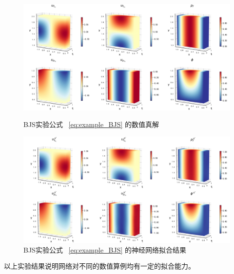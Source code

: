 \begin{figure}[H]
    \centering
    \includegraphics[width=0.75\linewidth]{images/example_BJS_exact.png}
    \caption{BJS实验公式 ~\eqref{eq:example_BJS} 的数值真解}
    \label{fig:example_BJS_exact}
    \includegraphics[width=0.75\linewidth]{images/example_BJS_fitted.png}
    \caption{BJS实验公式 ~\eqref{eq:example_BJS} 的神经网络拟合结果}
    \label{fig:example_BJS_fitted}
\end{figure}

以上实验结果说明网络对不同的数值算例均有一定的拟合能力。


